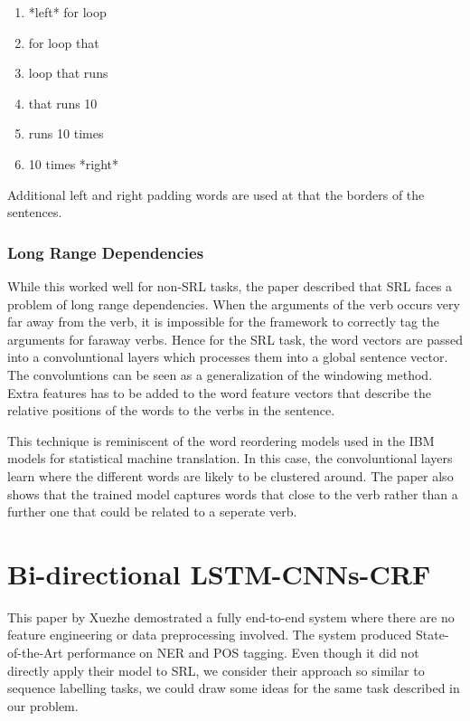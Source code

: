 \documentclass[fyp]{socreport}
\begin{document}
\begin{enumerate}
\setlength{\itemsep}{0pt}
\setlength{\parskip}{0pt}
\item *left* for loop
\item for loop that
\item loop that runs
\item that runs 10
\item runs 10 times
\item 10 times *right*
\end{enumerate}

Additional left and right padding words are used at that the borders of
the sentences.

\subsubsection{Long Range Dependencies} While this worked well for non-SRL
tasks, the paper described that SRL faces a problem of long range dependencies.
When the arguments of the verb occurs very far away from the verb, it is
impossible for the framework to correctly tag the arguments for faraway verbs.
Hence for the SRL task, the word vectors are passed into a convoluntional
layers which processes them into a global sentence vector. The convoluntions
can be seen as a generalization of the windowing method. Extra features has to
be added to the word feature vectors that describe the relative positions of
the words to the verbs in the sentence.

This technique is reminiscent of the word reordering models used in the IBM
models for statistical machine translation. In this case, the convoluntional
layers learn where the different words are likely to be clustered around.
The paper also shows that the trained model captures words that close to
the verb rather than a further one that could be related to a seperate verb.

\section{Bi-directional LSTM-CNNs-CRF}

This paper by Xuezhe \cite{2016arXiv160301354M} demostrated a fully end-to-end
system where there are no feature engineering or data preprocessing involved.
The system produced State-of-the-Art performance on NER and POS tagging. Even
though it did not directly apply their model to SRL, we consider their approach
so similar to sequence labelling tasks, we could draw some ideas for the same
task described in our problem.
\end{document}

